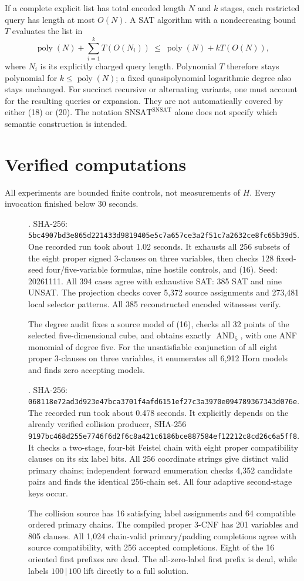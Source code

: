 \documentclass[11pt]{article}
\newcommand{\poly}{\operatorname{poly}}
\begin{document}
If a complete explicit list has total encoded length $N$ and $k$ stages,
each restricted query has length at most $O(N)$. A SAT algorithm with
a nondecreasing bound $T$ evaluates the list in
\[
 \poly(N)+\sum_{i=1}^kT(O(N_i))
 \ \le\ \poly(N)+kT(O(N)),
 \tag{20}
\]
where $N_i$ is its explicitly charged query length.
Polynomial $T$ therefore stays polynomial for $k\le\poly(N)$;
a fixed quasipolynomial logarithmic degree also stays unchanged.
For succinct recursive or alternating variants, one must account for
the resulting queries or expansion. They are not automatically
covered by either (18) or (20).
The notation $\mathrm{SNSAT}^{\mathrm{SNSAT}}$ alone does not specify
which semantic construction is intended.

\section{Verified computations}
All experiments are bounded finite controls, not measurements of $H$.
Every invocation finished below 30 seconds.
\begin{description}
\item[] .
SHA-256:
\texttt{5bc4907bd3e865d221433d9819405e5c7a657ce3a2f51c7a2632ce8fc65b39d5}.
One recorded run took about 1.02 seconds.
It exhausts all 256 subsets of the eight proper signed 3-clauses on
three variables, then checks 128 fixed-seed four/five-variable formulas,
nine hostile controls, and (16). Seed: 20261111.
All 394 cases agree with exhaustive SAT: 385 SAT and nine UNSAT.
The projection checks cover 5,372 source assignments and 273,481
local selector patterns. All 385 reconstructed encoded witnesses verify.
\item[] The degree audit fixes a source model of (16), checks all 32
points of the selected five-dimensional cube, and obtains exactly
$\operatorname{AND}_5$, with one ANF monomial of degree five.
For the unsatisfiable conjunction of all eight proper 3-clauses on
three variables, it enumerates all 6,912 Horn models and finds zero
accepting models.
\item[] .
SHA-256:
\texttt{068118e72ad3d923e47bca3701f4afd6151ef27c3a3970e094789367343d076e}.
The recorded run took about 0.478 seconds.
It explicitly depends on the already verified collision producer,
SHA-256
\texttt{9197bc468d255e7746f6d2f6c8a421c6186bce887584ef12212c8cd26c6a5ff8}.
It checks a two-stage, four-bit Feistel chain with eight proper
compatibility clauses on its six label bits.
All 256 coordinate strings give distinct valid primary chains;
independent forward enumeration checks 4,352 candidate pairs and
finds the identical 256-chain set.
All four adaptive second-stage keys occur.
\item[] The collision source has 16 satisfying label assignments and
64 compatible ordered primary chains. The compiled proper 3-CNF has
201 variables and 805 clauses.
All 1,024 chain-valid primary/padding completions agree with source
compatibility, with 256 accepted completions.
Eight of the 16 oriented first prefixes are dead.
The all-zero-label first prefix is dead, while labels
$100\,|\,100$ lift directly to a full solution.
\end{description}
\end{document}
